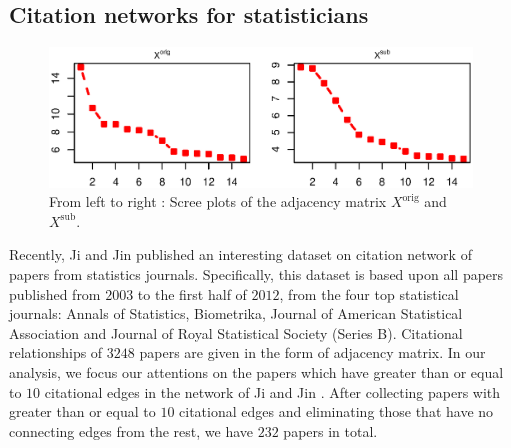 \documentclass[AMS,STIX1COL]{WileyNJD-v2}
\begin{document}
{%

\subsection{Citation networks for statisticians}
\label{sec:citation_network}
\begin{figure}[htbp]
\includegraphics[width=1\textwidth]{Fig4.eps}
\caption{From left to right : Scree plots of the adjacency matrix $X^{\mbox{orig}}$ and $X^{\mbox{sub}}$.}
\label{fig:figure4}
\end{figure}
Recently, Ji and Jin \cite{ji2016coauthorship} published an interesting dataset on citation network of papers from statistics journals.
Specifically, this dataset is based upon all papers published from $2003$ to the first half of $2012$, from the four top statistical journals: Annals of Statistics, Biometrika, Journal of American Statistical Association and Journal of Royal Statistical Society (Series B).
Citational relationships of $3248$ papers are given in the form of adjacency matrix.
In our analysis, we focus our attentions on the papers which have greater than or equal to $10$ citational edges in the network of Ji and Jin \cite{ji2016coauthorship}.
After collecting papers with greater than or equal to $10$ citational edges and eliminating those that have no connecting edges from the rest, we have $232$ papers in total.

}
\end{document}
